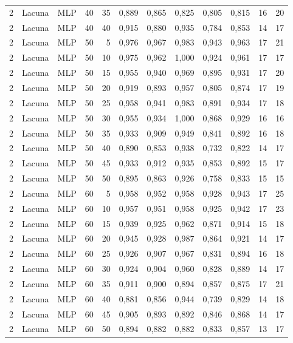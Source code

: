 \begin{longtable}{@{}rllrrrrrrrrr@{}}
2 & Lacuna & MLP & 40 & 35 & 0,889 & 0,865 & 0,825 & 0,805 & 0,815 & 16 & 20 \\
2 & Lacuna & MLP & 40 & 40 & 0,915 & 0,880 & 0,935 & 0,784 & 0,853 & 14 & 17 \\
2 & Lacuna & MLP & 50 & 5 & 0,976 & 0,967 & 0,983 & 0,943 & 0,963 & 17 & 21 \\
2 & Lacuna & MLP & 50 & 10 & 0,975 & 0,962 & 1,000 & 0,924 & 0,961 & 17 & 17 \\
2 & Lacuna & MLP & 50 & 15 & 0,955 & 0,940 & 0,969 & 0,895 & 0,931 & 17 & 20 \\
2 & Lacuna & MLP & 50 & 20 & 0,919 & 0,893 & 0,957 & 0,805 & 0,874 & 17 & 19 \\
2 & Lacuna & MLP & 50 & 25 & 0,958 & 0,941 & 0,983 & 0,891 & 0,934 & 17 & 18 \\
2 & Lacuna & MLP & 50 & 30 & 0,955 & 0,934 & 1,000 & 0,868 & 0,929 & 16 & 16 \\
2 & Lacuna & MLP & 50 & 35 & 0,933 & 0,909 & 0,949 & 0,841 & 0,892 & 16 & 18 \\
2 & Lacuna & MLP & 50 & 40 & 0,890 & 0,853 & 0,938 & 0,732 & 0,822 & 14 & 17 \\
2 & Lacuna & MLP & 50 & 45 & 0,933 & 0,912 & 0,935 & 0,853 & 0,892 & 15 & 17 \\
2 & Lacuna & MLP & 50 & 50 & 0,895 & 0,863 & 0,926 & 0,758 & 0,833 & 15 & 15 \\
2 & Lacuna & MLP & 60 & 5 & 0,958 & 0,952 & 0,958 & 0,928 & 0,943 & 17 & 25 \\
2 & Lacuna & MLP & 60 & 10 & 0,957 & 0,951 & 0,958 & 0,925 & 0,942 & 17 & 23 \\
2 & Lacuna & MLP & 60 & 15 & 0,939 & 0,925 & 0,962 & 0,871 & 0,914 & 15 & 18 \\
2 & Lacuna & MLP & 60 & 20 & 0,945 & 0,928 & 0,987 & 0,864 & 0,921 & 14 & 17 \\
2 & Lacuna & MLP & 60 & 25 & 0,926 & 0,907 & 0,967 & 0,831 & 0,894 & 16 & 18 \\
2 & Lacuna & MLP & 60 & 30 & 0,924 & 0,904 & 0,960 & 0,828 & 0,889 & 14 & 17 \\
2 & Lacuna & MLP & 60 & 35 & 0,911 & 0,900 & 0,894 & 0,857 & 0,875 & 17 & 21 \\
2 & Lacuna & MLP & 60 & 40 & 0,881 & 0,856 & 0,944 & 0,739 & 0,829 & 14 & 18 \\
2 & Lacuna & MLP & 60 & 45 & 0,905 & 0,893 & 0,892 & 0,846 & 0,868 & 14 & 17 \\
2 & Lacuna & MLP & 60 & 50 & 0,894 & 0,882 & 0,882 & 0,833 & 0,857 & 13 & 17 \\

\end{longtable}
